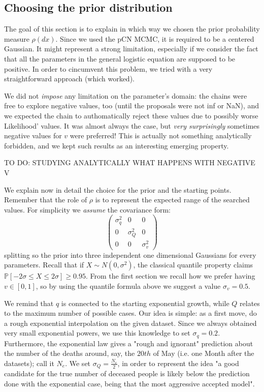 \documentclass[8pt]{article}
\begin{document}
\subsection{Choosing the prior distribution}
The goal of this section is to explain in which way we chosen the
prior probability measure $\rho(dx)$.
Since we used the pCN MCMC, it is required to be a centered Gaussian. 
It might represent
a strong limitation, especially if we consider the fact
that all the parameters in the general logistic equation
are supposed to be positive. In order to cincumvent this problem,
we tried with a very straightforward approach (which worked).


We did not \emph{impose}
any limitation on the parameter's domain: the chains
were free to explore negative values, too (until the proposals
were not inf or NaN), and we expected the chain to authomatically
reject these values due to possibly worse Likelihood' values.
It was almost always the case, but \emph{very surprisingly}
sometimes negative values for $v$ were preferred!
This is actually not something analytically forbidden, and we kept
such results as an interesting emerging property.


TO DO: STUDYING ANALYTICALLY WHAT HAPPENS WITH NEGATIVE V


We explain now in detail the choice for the prior and the starting points.
Remember that the role of $\rho$
is to represent the expected range of the searched values.
For simplicity we \emph{assume} the covariance form:
\begin{equation}
\begin{pmatrix}
	\sigma_q^2 & 0 & 0 \\
	0 & \sigma_Q^2 & 0 \\
	0 & 0 & \sigma_v^2
\end{pmatrix}
\end{equation}
splitting so the prior into three independent one dimensional Gaussians for
every parameters. Recall that if $X \sim N(0,\sigma^2)$, the classical
quantile property claims 
$\mathbb{P}[-2 \sigma \leq X \leq 2 \sigma] \geq 0.95$.
From the first section we recall how we prefer having $v \in [0,1]$, so by
using the quantile formula above we suggest a value $\sigma_v = 0.5$.

We remind that $q$ is connected to the starting exponential growth, while $Q$ 
relates to the maximum number of possible cases. 
Our idea is simple: as a first move,
do a rough exponential interpolation on the given dataset. 
Since we always obtained very small exponential powers,
we use this knowledge to set  $\sigma_q = 0.2$.
Furthermore, the exponential law gives a "rough and ignorant"
prediction about the number of the deaths around, say, the $20th$ of May
(i.e. one Month after the datasets); call it $N_e$.
We set $\sigma_Q = \frac{N_e}{2}$, in order to represent the idea
"a good candidate for the true number of deceased people is likely
below the prediction done with the exponential case, being that the
most aggressive accepted model".
\end{document}
